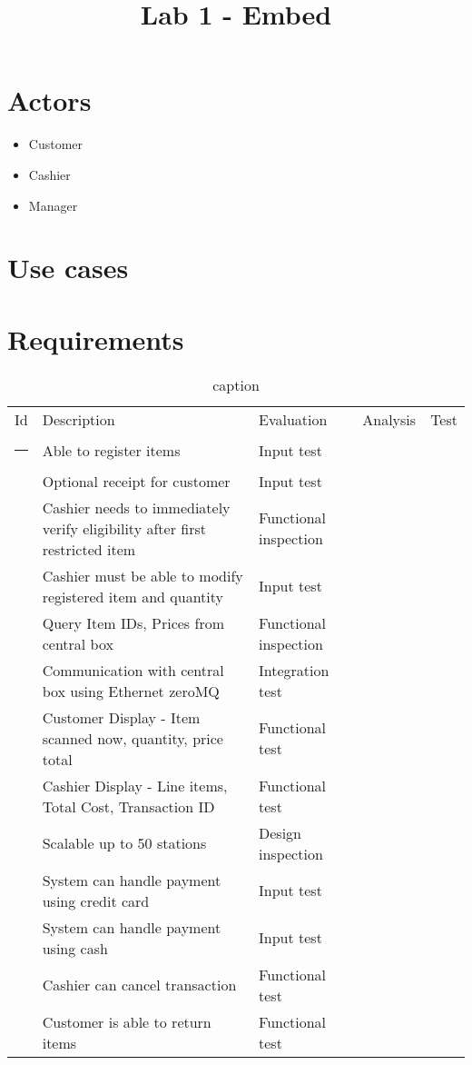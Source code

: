\documentclass{article}
\begin{document}
\title{Lab 1 - Embed}
\date{}
\maketitle

\section{Actors}

\begin{itemize}
    \item Customer
    \item Cashier
    \item Manager
\end{itemize}

\section{Use cases}


\section{Requirements}
\begin{table}[h]
    \centering
    \begin{tabular}{l|l|l|l|l}
        Id& Description  & Evaluation  & Analysis & Test\\
        \hrule
        & Able to register items & Input test  && \\
        & Optional receipt for customer & Input test && \\
        & Cashier needs to immediately verify eligibility after first restricted item  & Functional inspection&&\\
        & Cashier must be able to modify registered item and quantity & Input test&& \\
        & Query Item IDs, Prices from central box  & Functional inspection&& \\
        & Communication with central box using Ethernet zeroMQ & Integration test && \\
        & Customer Display - Item scanned now, quantity, price total & Functional test&& \\
        & Cashier Display  - Line items, Total Cost, Transaction ID & Functional test&&\\ 
        & Scalable up to 50 stations &Design inspection&& \\
        & System can handle payment using credit card & Input test&& \\
        & System can handle payment using cash & Input test&& \\
        & Cashier can cancel transaction & Functional test && \\
        & Customer is able to return items & Functional test&& \\

    \end{tabular}
    \caption{caption}
    \label{tab:label}
\end{table}
\end{document}
